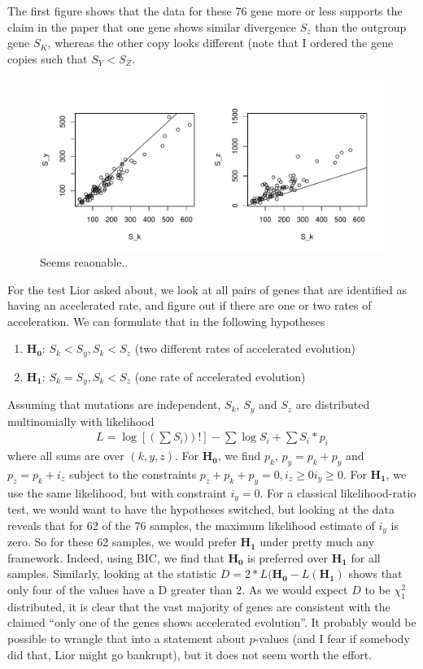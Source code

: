 \documentclass[10pt,letterpaper]{article}
\newcommand{\bb}[1]{\mathbf{#1}}
\begin{document}
The first figure shows that the data for these 76 gene more or less supports the claim in the paper that one gene shows similar divergence $S_z$ than the outgroup gene $S_K$, whereas the other copy looks different (note that I ordered the gene copies such that $S_Y < S_Z$.
\begin{figure}[h!]
  \caption{Seems reaonable..}
  \centering
    \includegraphics[width=1.2\textwidth]{kellis1.pdf}
\end{figure}

For the test Lior asked about, we look at all pairs of genes that are identified as having an accelerated rate, and figure out if there are one or two rates of acceleration. We can formulate that in the following hypotheses
\begin{enumerate}
\item $\bb{H_0}$: $S_k < S_y, S_k < S_z$ (two different rates of accelerated evolution)
\item $\bb{H_1}$: $S_k = S_y, S_k < S_z$ (one rate of accelerated evolution)
\end{enumerate}
Assuming that mutations are independent, $S_k$, $S_y$ and $S_z$ are distributed multinomially with likelihood
\begin{align*}
L = \log\left[\left(\sum S_i)\right)!\right] - \sum \log{S_i} + \sum S_i * p_i
\end{align*}
where all sums are over $(k, y, z)$.
For $\bb{H_0}$, we find $p_k$, $p_y = p_k + p_y$ and $p_z = p_k + i_z$ subject to the constraints 
$p_z + p_k + p_y =0, i_z \geq 0 i_y \geq 0$.
For $\bb{H_1}$, we use the same likelihood, but with constraint $i_y=0$. For a classical likelihood-ratio test, we would want to have the hypotheses switched, but looking at the data reveals that for 62 of the 76 samples, the maximum likelihood estimate of $i_y$ is zero. So for these 62 samples, we would prefer $\bb{H_1}$ under pretty much any framework. Indeed, using BIC, we find that $\bb{H_0}$ is preferred over $\bb{H_1}$ for all samples. Similarly, looking at the statistic $D = 2* L(\bb{H_0} - L(\bb{H_1})$ shows that only four of the values have a D greater than 2. As we would expect $D$ to be $\chi^2_1$ distributed, it is clear that the vast majority of genes are consistent with the claimed ``only one of the genes shows accelerated evolution''. It probably would be possible to wrangle that into a statement about $p$-values (and I fear if somebody did that, Lior might go bankrupt), but it does not seem worth the effort.
\end{document}
